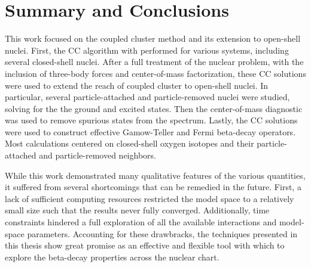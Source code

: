 \documentclass[../thesis.tex]{subfiles}
\begin{document}
\section{Summary and Conclusions}

This work focused on the coupled cluster method and its extension to open-shell nuclei.  First, the CC algorithm with performed for various systems, including several closed-shell nuclei.  After a full treatment of the nuclear problem, with the inclusion of three-body forces and center-of-mass factorization, these CC solutions were used to extend the reach of coupled cluster to open-shell nuclei.  In particular, several particle-attached and particle-removed nuclei were studied, solving for the the ground and excited states.  Then the center-of-mass diagnostic was used to remove spurious states from the spectrum.  Lastly, the CC solutions were used to construct effective Gamow-Teller and Fermi beta-decay operators.  Most calculations centered on closed-shell oxygen isotopes and their particle-attached and particle-removed neighbors.

While this work demonstrated many qualitative features of the various quantities, it suffered from several shortcomings that can be remedied in the future.  First, a lack of sufficient computing resources restricted the model space to a relatively small size such that the results never fully converged.  Additionally, time constraints hindered a full exploration of all the available interactions and model-space parameters.  Accounting for these drawbracks, the techniques presented in this thesis show great promise as an effective and flexible tool with which to explore the beta-decay properties across the nuclear chart.  
\end{document}
